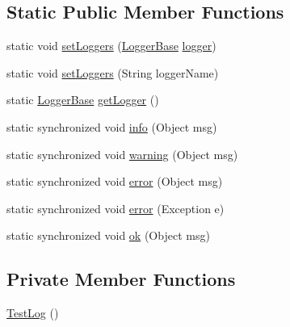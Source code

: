 \subsection*{Static Public Member Functions}
\begin{DoxyCompactItemize}
\item 
static void \hyperlink{classit_1_1emarolab_1_1cagg_1_1interfaces_1_1TestLog_a63a6d042b63db9079644d55e7caa7f5f}{set\-Loggers} (\hyperlink{classit_1_1emarolab_1_1cagg_1_1debugging_1_1DebuggingText_1_1LoggerBase}{Logger\-Base} \hyperlink{classit_1_1emarolab_1_1cagg_1_1interfaces_1_1TestLog_a2ff47554fb18b3c452d1c5150b387674}{logger})
\item 
static void \hyperlink{classit_1_1emarolab_1_1cagg_1_1interfaces_1_1TestLog_acd97bffe918996d09a8861ff2f34cbc8}{set\-Loggers} (String logger\-Name)
\item 
static \hyperlink{classit_1_1emarolab_1_1cagg_1_1debugging_1_1DebuggingText_1_1LoggerBase}{Logger\-Base} \hyperlink{classit_1_1emarolab_1_1cagg_1_1interfaces_1_1TestLog_ab2f786ddffcddb0d0aeeabbf9ff8c625}{get\-Logger} ()
\item 
static synchronized void \hyperlink{classit_1_1emarolab_1_1cagg_1_1interfaces_1_1TestLog_a7d68820b65a08bac84aebf41f66e4c7c}{info} (Object msg)
\item 
static synchronized void \hyperlink{classit_1_1emarolab_1_1cagg_1_1interfaces_1_1TestLog_a79c2c3234fdabe918da1555cd5b85d1f}{warning} (Object msg)
\item 
static synchronized void \hyperlink{classit_1_1emarolab_1_1cagg_1_1interfaces_1_1TestLog_a9d14f5a62e0808d3700a6f9e6d2eb7e4}{error} (Object msg)
\item 
static synchronized void \hyperlink{classit_1_1emarolab_1_1cagg_1_1interfaces_1_1TestLog_a83b816a85e5550836f9558106bf69b8f}{error} (Exception e)
\item 
static synchronized void \hyperlink{classit_1_1emarolab_1_1cagg_1_1interfaces_1_1TestLog_a42f2a6db3a2d2da780ffac3084e43352}{ok} (Object msg)
\end{DoxyCompactItemize}
\subsection*{Private Member Functions}
\begin{DoxyCompactItemize}
\item 
\hyperlink{classit_1_1emarolab_1_1cagg_1_1interfaces_1_1TestLog_a5c1d2cf1ca0860dbbaf5ea8b7b1f1b39}{Test\-Log} ()
\end{DoxyCompactItemize}
